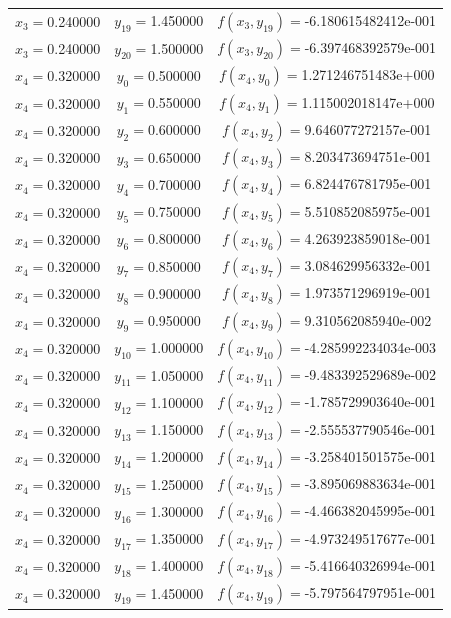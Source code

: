 \begin{longtable}{ccc}
$x_{3}=$0.240000 & $y_{19}=$1.450000 & $f(x_{3},y_{19})=$-6.180615482412e-001 \\
$x_{3}=$0.240000 & $y_{20}=$1.500000 & $f(x_{3},y_{20})=$-6.397468392579e-001 \\
$x_{4}=$0.320000 & $y_{0}=$0.500000 & $f(x_{4},y_{0})=$1.271246751483e+000 \\
$x_{4}=$0.320000 & $y_{1}=$0.550000 & $f(x_{4},y_{1})=$1.115002018147e+000 \\
$x_{4}=$0.320000 & $y_{2}=$0.600000 & $f(x_{4},y_{2})=$9.646077272157e-001 \\
$x_{4}=$0.320000 & $y_{3}=$0.650000 & $f(x_{4},y_{3})=$8.203473694751e-001 \\
$x_{4}=$0.320000 & $y_{4}=$0.700000 & $f(x_{4},y_{4})=$6.824476781795e-001 \\
$x_{4}=$0.320000 & $y_{5}=$0.750000 & $f(x_{4},y_{5})=$5.510852085975e-001 \\
$x_{4}=$0.320000 & $y_{6}=$0.800000 & $f(x_{4},y_{6})=$4.263923859018e-001 \\
$x_{4}=$0.320000 & $y_{7}=$0.850000 & $f(x_{4},y_{7})=$3.084629956332e-001 \\
$x_{4}=$0.320000 & $y_{8}=$0.900000 & $f(x_{4},y_{8})=$1.973571296919e-001 \\
$x_{4}=$0.320000 & $y_{9}=$0.950000 & $f(x_{4},y_{9})=$9.310562085940e-002 \\
$x_{4}=$0.320000 & $y_{10}=$1.000000 & $f(x_{4},y_{10})=$-4.285992234034e-003 \\
$x_{4}=$0.320000 & $y_{11}=$1.050000 & $f(x_{4},y_{11})=$-9.483392529689e-002 \\
$x_{4}=$0.320000 & $y_{12}=$1.100000 & $f(x_{4},y_{12})=$-1.785729903640e-001 \\
$x_{4}=$0.320000 & $y_{13}=$1.150000 & $f(x_{4},y_{13})=$-2.555537790546e-001 \\
$x_{4}=$0.320000 & $y_{14}=$1.200000 & $f(x_{4},y_{14})=$-3.258401501575e-001 \\
$x_{4}=$0.320000 & $y_{15}=$1.250000 & $f(x_{4},y_{15})=$-3.895069883634e-001 \\
$x_{4}=$0.320000 & $y_{16}=$1.300000 & $f(x_{4},y_{16})=$-4.466382045995e-001 \\
$x_{4}=$0.320000 & $y_{17}=$1.350000 & $f(x_{4},y_{17})=$-4.973249517677e-001 \\
$x_{4}=$0.320000 & $y_{18}=$1.400000 & $f(x_{4},y_{18})=$-5.416640326994e-001 \\
$x_{4}=$0.320000 & $y_{19}=$1.450000 & $f(x_{4},y_{19})=$-5.797564797951e-001 \\

\end{longtable}
